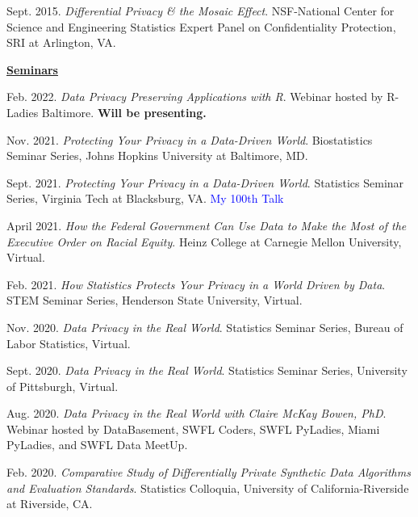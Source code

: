\documentclass[11pt, letterpaper, roman]{moderncv} %
\begin{document}
\begin{etaremune}[topsep=0pt, itemsep=6pt, partopsep=0pt, parsep=0pt]
    \item Sept. 2015. \textit{Differential Privacy \& the Mosaic Effect}. NSF-National Center for Science and Engineering Statistics Expert Panel on Confidentiality Protection, SRI at Arlington, VA.

\vspace{6pt}
\hspace{-0.30in}\underline{\textbf{\large Seminars}}\normalsize
    \item Feb. 2022. \textit{Data Privacy Preserving Applications with R}. Webinar hosted by R-Ladies Baltimore. \textbf{Will be presenting.}
    
    \item Nov. 2021. \textit{Protecting Your Privacy in a Data-Driven World}. Biostatistics Seminar Series, Johns Hopkins University at Baltimore, MD.
    
    \item Sept. 2021. \textit{Protecting Your Privacy in a Data-Driven World}. Statistics Seminar Series, Virginia Tech at Blacksburg, VA. \textcolor{blue}{My 100th Talk}
    
    \item April 2021. \textit{How the Federal Government Can Use Data to Make the Most of the Executive Order on Racial Equity}. Heinz College at Carnegie Mellon University, Virtual.

    \item Feb. 2021. \textit{How Statistics Protects Your Privacy in a World Driven by Data}. STEM Seminar Series, Henderson State University, Virtual.

    \item Nov. 2020. \textit{Data Privacy in the Real World}. Statistics Seminar Series, Bureau of Labor Statistics, Virtual.

    \item Sept. 2020. \textit{Data Privacy in the Real World}. Statistics Seminar Series, University of Pittsburgh, Virtual.
        
    \item Aug. 2020. \textit{Data Privacy in the Real World with Claire McKay Bowen, PhD}. Webinar hosted by DataBasement, SWFL Coders, SWFL PyLadies, Miami PyLadies, and SWFL Data MeetUp.
    
    \item Feb. 2020. \textit{Comparative Study of Differentially Private Synthetic Data Algorithms and Evaluation Standards}. Statistics Colloquia, University of California-Riverside at Riverside, CA.
    

\end{etaremune}
\end{document}
